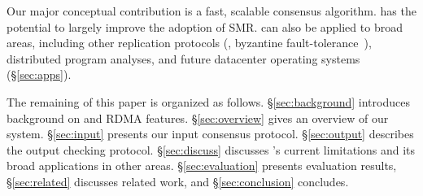 Our major conceptual contribution is a fast, scalable \paxos consensus 
algorithm. \xxx has the potential to largely improve the adoption of SMR. \xxx 
can also be applied to broad areas, including other replication protocols (\eg, 
byzantine fault-tolerance~\cite{zyzzyva:sosp07,pbft:osdi99}), distributed 
program analyses, and future datacenter operating systems (\S\ref{sec:apps}). 


The remaining of this paper is organized as follows. \S\ref{sec:background} 
introduces background on \paxos and RDMA features. \S\ref{sec:overview} gives 
an overview of our \xxx system. \S\ref{sec:input} presents our input consensus 
protocol. \S\ref{sec:output} describes the output checking protocol. 
\S\ref{sec:discuss} discusses \xxx's current limitations and its broad 
applications in other areas. \S\ref{sec:evaluation} presents evaluation 
results, \S\ref{sec:related} discusses related work, and \S\ref{sec:conclusion} 
concludes.   